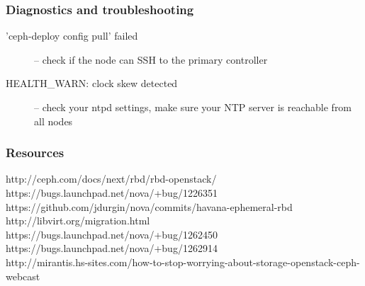 \documentclass[hyperref=unicode,utf8,xcolor=pst]{beamer}
\begin{document}
\begin{frame}
	\frametitle{Diagnostics and troubleshooting}
	\begin{description}
		\item['ceph-deploy config pull' failed] -- check if the
			node can SSH to the primary controller
		\item[HEALTH\_WARN: clock skew detected] -- check your
			ntpd settings, make sure your NTP server is
			reachable from all nodes
	\end{description}
\end{frame}

\begin{frame}
	\frametitle{Resources}
	http://ceph.com/docs/next/rbd/rbd-openstack/\\
	https://bugs.launchpad.net/nova/+bug/1226351\\
	https://github.com/jdurgin/nova/commits/havana-ephemeral-rbd\\
	http://libvirt.org/migration.html\\
	https://bugs.launchpad.net/nova/+bug/1262450\\
	https://bugs.launchpad.net/nova/+bug/1262914\\
	http://mirantis.hs-sites.com/how-to-stop-worrying-about-storage-openstack-ceph-webcast\\
\end{frame}
\end{document}
